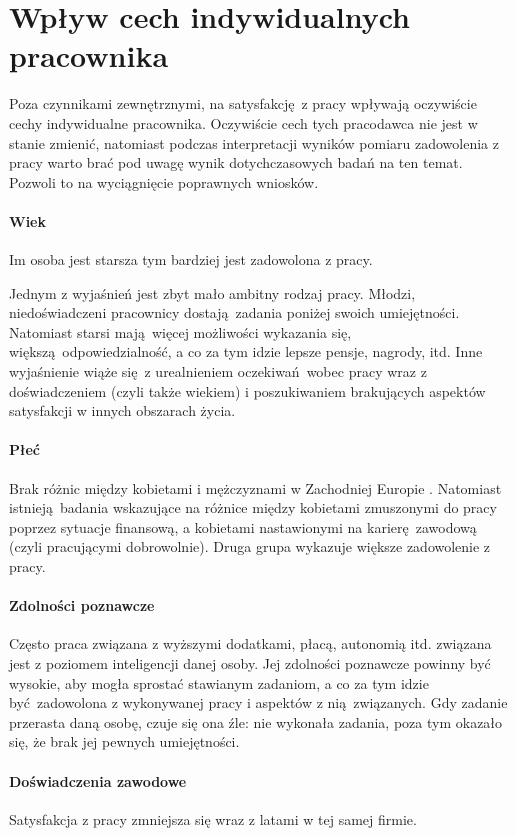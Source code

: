 \section{Wpływ cech indywidualnych pracownika}
\label{sec:theory-sat-age}
Poza czynnikami zewnętrznymi, na satysfakcję z pracy wpływają oczywiście cechy indywidualne pracownika. Oczywiście cech tych pracodawca nie jest w stanie zmienić, natomiast podczas interpretacji wyników pomiaru zadowolenia z pracy warto brać pod uwagę wynik dotychczasowych badań na ten temat. Pozwoli to na wyciągnięcie poprawnych wniosków.

\paragraph{Wiek} Im osoba jest starsza tym bardziej jest zadowolona z pracy. 

Jednym z wyjaśnień jest zbyt mało ambitny rodzaj pracy. Młodzi, niedoświadczeni pracownicy dostają zadania poniżej swoich umiejętności. Natomiast starsi mają więcej możliwości wykazania się, większą odpowiedzialność, a co za tym idzie lepsze pensje, nagrody, itd. Inne wyjaśnienie wiąże się z urealnieniem oczekiwań wobec pracy wraz z doświadczeniem (czyli
także wiekiem) i poszukiwaniem brakujących aspektów satysfakcji w innych obszarach życia.
\paragraph{Płeć} Brak różnic między kobietami i mężczyznami w Zachodniej Europie \cite{de1991gender}. Natomiast istnieją badania wskazujące na różnice między kobietami zmuszonymi do pracy poprzez sytuacje finansową, a kobietami nastawionymi na karierę zawodową (czyli pracującymi dobrowolnie). Druga grupa wykazuje większe zadowolenie z pracy.
\paragraph{Zdolności poznawcze} Często praca związana z wyższymi dodatkami, płacą, autonomią itd. związana jest z poziomem inteligencji danej osoby. Jej zdolności poznawcze powinny być wysokie, aby mogła sprostać stawianym zadaniom, a co za tym idzie być zadowolona z wykonywanej pracy i aspektów z nią związanych. Gdy zadanie przerasta daną osobę, czuje się ona źle: nie wykonała zadania, poza tym okazało się, że brak jej pewnych umiejętności.
\paragraph{Doświadczenia zawodowe} Satysfakcja z pracy zmniejsza się wraz z latami w tej samej firmie. 

